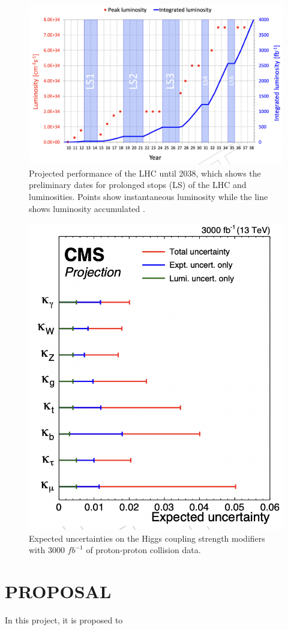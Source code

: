 \documentclass[final,3p]{CSP}
\begin{document}
\begin{figure}[H]
  \centering
  \includegraphics[width=0.8\columnwidth]{./HLLHCLumi.png}
  \caption{Projected performance of the LHC until 2038, which shows the preliminary dates for prolonged stops (LS) of the LHC and luminosities. Points show instantaneous luminosity while the line shows luminosity accumulated \cite{collaborations2019report}.}
  \label{figure6}
\end{figure}


 \begin{figure}[H]
   \centering
   \includegraphics[width=0.5\columnwidth]{./higgs_couplings.png}
   \caption{Expected uncertainties on the Higgs coupling strength modifiers with 3000 $fb^{-1}$ of proton-proton collision data.}
   \label{figureKappasUncs}
 \end{figure}



\section{PROPOSAL}

\onehalfspacing
In this project, it is proposed to
\end{document}
